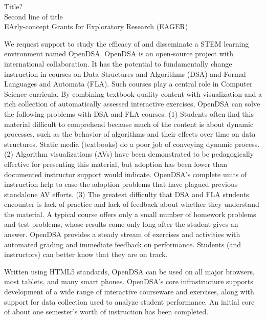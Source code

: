 \documentclass[11pt]{article}
\begin{document}
\newcommand{\NP}{\mbox{${\cal NP}$}}
\renewcommand{\floatpagefraction}{.90} %
\renewcommand{\textfraction}{.10}

\begin{center}
\Large
Title?\\
Second line of title\\

\bigskip
EArly-concept Grants for Exploratory Research (EAGER)\\

\end{center}

\newpage

\pagestyle{empty}

We request support to study the efficacy 
of and disseminate a STEM learning environment named OpenDSA.
OpenDSA is an open-source project with international collaboration.
It has the potential to fundamentally change instruction in courses on
Data Structures and Algorithms (DSA) and Formal Languages and Automata
(FLA).
Such courses play a central role in Computer Science curricula.
By combining textbook-quality content with visualization and a rich
collection of automatically assessed interactive exercises,
OpenDSA can solve the following problems with DSA and FLA courses.
(1) Students often find this material difficult to comprehend because
much of the content is about dynamic processes, such as the behavior
of algorithms and their effects over time on data structures.
Static media (textbooks) do a poor job of conveying dynamic process.
(2) Algorithm visualizations (AVs) have been demonstrated to be
pedagogically effective for presenting this material,
but adoption has been lower than documented instructor
support would indicate.
OpenDSA's complete units of instruction help to ease the adoption
problems that have plagued previous standalone AV efforts.
(3) The greatest difficulty that DSA and FLA students encounter is
lack of practice and lack of feedback about whether they understand
the material.
A typical course offers only a small number of homework
problems and test problems, whose results come only long after the
student gives an answer.
OpenDSA provides a steady stream of exercises and activities
with automated grading and immediate feedback on performance.
Students (and instructors) can better know that they are on track.

Written using HTML5 standards, OpenDSA can be used on all major
browsers, most tablets, and many smart phones.
OpenDSA's core infrastructure supports development of a wide range
of interactive courseware and exercises, along with support for data
collection used to analyze student performance.
An initial core of about one semester's worth of instruction has been
completed.
\end{document}
